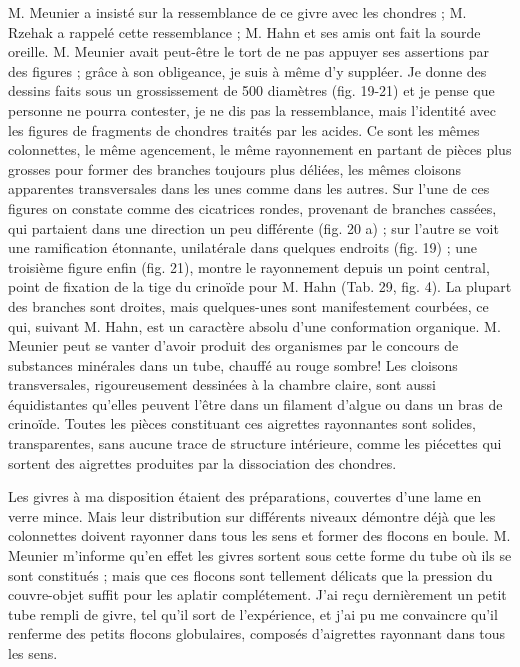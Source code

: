 \documentclass[a4paper, 12pt, oneside, french]{article}
\begin{document}
M. Meunier a insisté sur la ressemblance de ce givre avec les chondres ; M. Rzehak a rappelé cette ressemblance ; M. Hahn et ses amis ont fait la sourde oreille. M. Meunier avait peut-être le tort de ne pas appuyer ses assertions par des figures ; grâce à son obligeance, je suis à même d'y suppléer. Je donne des dessins faits sous un grossissement de 500 diamètres (fig. 19-21) et je pense que personne ne pourra contester, je ne dis pas la ressemblance, mais l'identité avec les figures de fragments de chondres traités par les acides. Ce sont les mêmes colonnettes, le même agencement, le même rayonnement en partant de pièces plus grosses pour former des branches toujours plus déliées, les mêmes cloisons apparentes transversales dans les unes comme dans les autres. Sur l'une de ces figures on constate comme des cicatrices rondes, provenant de branches cassées, qui partaient dans une direction un peu différente (fig. 20 a) ; sur l'autre se voit une ramification étonnante, unilatérale dans quelques endroits (fig. 19) ; une troisième figure enfin (fig. 21), montre le rayonnement depuis un point central, point de fixation de la tige du crinoïde pour M. Hahn (Tab. 29, fig. 4). La plupart des branches sont droites, mais quelques-unes sont manifestement courbées, ce qui, suivant M. Hahn, est un caractère absolu d'une conformation organique. M. Meunier peut se vanter d'avoir produit des organismes par le concours de substances minérales dans un tube, chauffé au rouge sombre! Les cloisons transversales, rigoureusement dessinées à la chambre claire, sont aussi équidistantes qu'elles peuvent l'être dans un filament d'algue ou dans un bras de crinoïde. Toutes les pièces constituant ces aigrettes rayonnantes sont solides, transparentes, sans aucune trace de structure intérieure, comme les piécettes qui sortent des aigrettes produites par la dissociation des chondres.

Les givres à ma disposition étaient des préparations, couvertes d'une lame en verre mince. Mais leur distribution sur différents niveaux démontre déjà que les colonnettes doivent rayonner dans tous les sens et former des flocons en boule. M. Meunier m'informe qu'en effet les givres sortent sous cette forme du tube où ils se sont constitués ; mais que ces flocons sont tellement délicats que la pression du couvre-objet suffit pour les aplatir complétement. J'ai reçu dernièrement un petit tube rempli de givre, tel qu'il sort de l'expérience, et j'ai pu me convaincre qu'il renferme des petits flocons globulaires, composés d'aigrettes rayonnant dans tous les sens.
\end{document}
